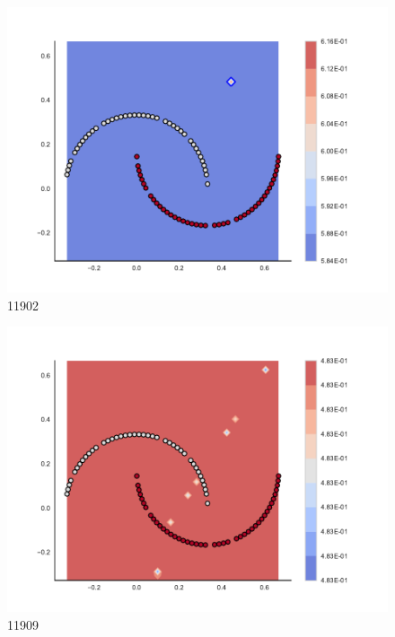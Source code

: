 \begin{subfigure}[b]{0.09\textwidth}
    \includegraphics[clip, trim=2.35cm 1.75cm 4.5cm 0cm,width=\textwidth]{img/convergence/11902.pdf}
    \caption{11902}
    \label{fig:convergence_11902}
\end{subfigure}
%
\begin{subfigure}[b]{0.09\textwidth}
    \includegraphics[clip, trim=2.35cm 1.75cm 4.5cm 0cm,width=\textwidth]{img/convergence/11909.pdf}
    \caption{11909}
    \label{fig:convergence_11909}
\end{subfigure}
%
